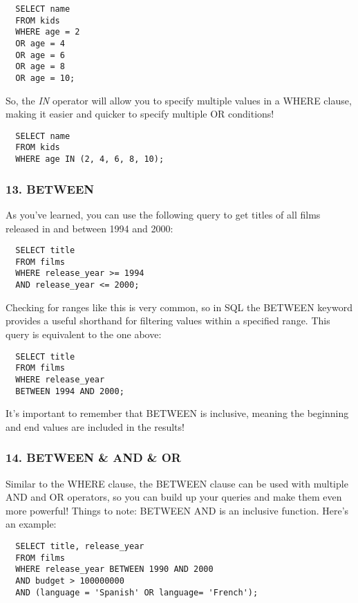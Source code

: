 \documentclass[
]{article}
\begin{document}
\begin{verbatim}
  SELECT name
  FROM kids
  WHERE age = 2
  OR age = 4
  OR age = 6
  OR age = 8
  OR age = 10;
\end{verbatim}

So, the \emph{IN} operator will allow you to specify multiple values in
a WHERE clause, making it easier and quicker to specify multiple OR
conditions!

\begin{verbatim}
  SELECT name
  FROM kids
  WHERE age IN (2, 4, 6, 8, 10);
\end{verbatim}

\hypertarget{between}{%
\subsubsection{13. BETWEEN}\label{between}}

As you've learned, you can use the following query to get titles of all
films released in and between 1994 and 2000:

\begin{verbatim}
  SELECT title
  FROM films
  WHERE release_year >= 1994
  AND release_year <= 2000;
\end{verbatim}

Checking for ranges like this is very common, so in SQL the BETWEEN
keyword provides a useful shorthand for filtering values within a
specified range. This query is equivalent to the one above:

\begin{verbatim}
  SELECT title
  FROM films
  WHERE release_year
  BETWEEN 1994 AND 2000;
\end{verbatim}

It's important to remember that BETWEEN is inclusive, meaning the
beginning and end values are included in the results!

\hypertarget{between-and-or}{%
\subsubsection{14. BETWEEN \& AND \& OR}\label{between-and-or}}

Similar to the WHERE clause, the BETWEEN clause can be used with
multiple AND and OR operators, so you can build up your queries and make
them even more powerful! Things to note: BETWEEN AND is an inclusive
function. Here's an example:

\begin{verbatim}
  SELECT title, release_year
  FROM films
  WHERE release_year BETWEEN 1990 AND 2000
  AND budget > 100000000
  AND (language = 'Spanish' OR language= 'French');
\end{verbatim}
\end{document}

